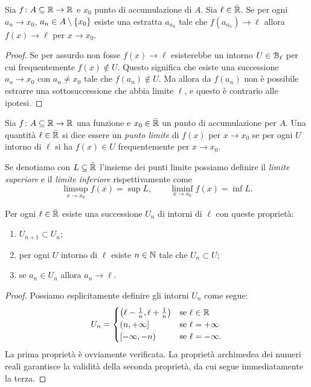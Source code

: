 \begin{proposition}
  \label{prop:convergenza}
Sia $f\colon A\subseteq {\mathbb R}\to {\mathbb R}$ e $x_0$ punto di accumulazione di $A$.
Sia $\ell\in \bar {{\mathbb R}}$.
Se per ogni $a_n\to x_0$, $a_n\in A\setminus{\left\{ x_0 \right\}}$
esiste una estratta $a_{n_k}$ tale che $f(a_{n_k})\to \ell$ 
allora $f(x)\to \ell$ per $x\to x_0$.
\end{proposition}
%
\begin{proof}
  Se per assurdo non fosse $f(x) \to \ell$
  esisterebbe un intorno $U\in \mathcal B_\ell$
  per cui frequentemente $f(x) \not \in U$.
  Questo significa che esiste una successione
  $a_n\to x_0$ con $a_n\neq x_0$ tale che $f(a_n)\not \in U$.
  Ma allora da $f(a_n)$
  non è possibile estrarre una sottosuccessione
  che abbia limite $\ell$, e questo è contrario alle
  ipotesi.
\end{proof}

\begin{definition}
  Sia $f\colon A\subseteq {\mathbb R} \to {\mathbb R}$ una funzione e $x_0\in \bar {{\mathbb R}}$ 
  un punto di accumulazione per $A$.
  Una quantità $\ell\in \bar{{\mathbb R}}$ si dice essere
  un \emph{punto limite}%
%
 di $f(x)$ per $x\to x_0$ se 
  per ogni $U$ intorno di $\ell$ si ha $f(x)\in U$ 
  frequentemente per $x\to x_0$.
  
  Se denotiamo con $L\subseteq \bar{{\mathbb R}}$ l'insieme
  dei punti limite possiamo definire il \emph{limite superiore} e il
  \emph{limite inferiore}
  rispettivamente come
  \[
  \limsup_{x\to x_0} f(x) = \sup L, \qquad
  \liminf_{x\to x_0} f(x) = \inf L.
  \]
\end{definition}
  
\begin{proposition}%
  \label{prop:base_numerabile}%
  Per ogni $\ell\in \bar {{\mathbb R}}$ esiste una successione $U_n$ di intorni di $\ell$ 
  con queste proprietà:
  \begin{enumerate}
    \item $U_{n+1}\subset U_n$;
    \item per ogni $U$ intorno di $\ell$ esiste $n\in {\mathbb N}$ tale che $U_n\subset U$;
    \item se $a_n\in U_n$ allora $a_n\to \ell$.
  \end{enumerate}
\end{proposition}
\begin{proof}
Possiamo esplicitamente definire gli intorni $U_n$ come segue:
\[
  U_n = 
  \begin{cases}
    \left(\ell-\frac 1 n,\ell+\frac 1 n\right) & \text{se $\ell\in {\mathbb R}$}\\ 
    \left(n,+\infty\right] & \text{se $\ell=+\infty$}\\
    \left[-\infty,-n\right) & \text{se $\ell=-\infty$.}
  \end{cases}
\]
La prima proprietà è ovviamente verificata.
La proprietà archimedea dei numeri reali garantisce la validità della seconda 
proprietà, da cui segue immediatamente la terza.
\end{proof}

